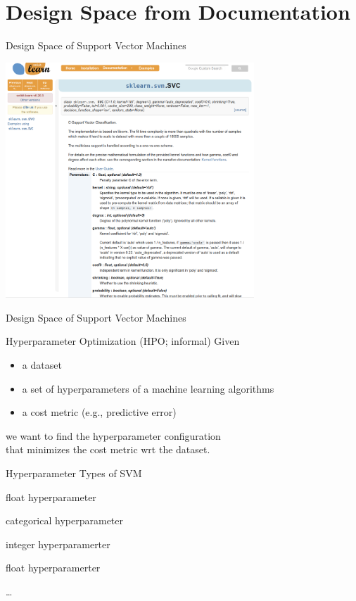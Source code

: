 \section{Design Space from Documentation}
\begin{frame}[c]{Design Space of Support Vector Machines}

\centering
\includegraphics[width=0.7\textwidth]{images/sklearn_svm_doc.png}

\end{frame}
\begin{frame}[c]{Design Space of Support Vector Machines}

\begin{block}{Hyperparameter Optimization (HPO; informal)}
Given
\begin{itemize}
  \item a dataset
  \item a set of hyperparameters of a machine learning algorithms
  \item a cost metric (e.g., predictive error)
\end{itemize}
we want to find the hyperparameter configuration\\ that minimizes the cost metric wrt the dataset. 
\end{block}

\begin{block}{Hyperparameter Types of SVM}
\begin{description}
  \item[C] float hyperparameter
  \item[Kernel] categorical hyperparameter
  \item[Degree] integer hyperparamerter
  \item[gamma] float hyperparamerter
  \item \ldots
\end{description}
\end{block}

\end{frame}
